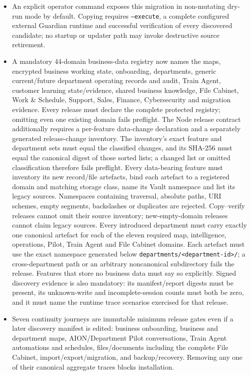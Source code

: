 \documentclass[11pt]{article}
\newcommand{\code}[1]{\texttt{#1}}
\begin{document}
\begin{itemize}
  \item An explicit operator command exposes this migration in non-mutating dry-run mode by default. Copying requires \code{--execute}, a complete configured external Guardian runtime and successful verification of every discovered candidate; no startup or updater path may invoke destructive source retirement.
  \item A mandatory 44-domain business-data registry now names the maps, encrypted business working state, onboarding, departments, generic current/future department operating records and audit, Train Agent, customer learning state/evidence, shared business knowledge, File Cabinet, Work \& Schedule, Support, Sales, Finance, Cybersecurity and migration evidence. Every release must declare the complete protected registry; omitting even one existing domain fails preflight. The Node release contract additionally requires a per-feature data-change declaration and a separately generated release-change inventory. The inventory's exact feature and department sets must equal the classified changes, and its SHA-256 must equal the canonical digest of those sorted lists; a changed list or omitted classification therefore fails preflight. Every data-bearing feature must inventory its new record/file artefacts, bind each artefact to a registered domain and matching storage class, name its Vault namespace and list its legacy sources. Namespaces containing traversal, absolute paths, URI schemes, empty segments, backslashes or duplicates are rejected. Copy--verify releases cannot omit their source inventory; new-empty-domain releases cannot claim legacy sources. Every introduced department must carry exactly one canonical artefact for each of the eleven required map, intelligence, operations, Pilot, Train Agent and File Cabinet domains. Each artefact must use the exact namespace generated below \code{departments/<department-id>/}; a cross-department path or an arbitrary noncanonical subdirectory fails the release. Features that store no business data must say so explicitly. Signed discovery evidence is also mandatory: its manifest/report digests must be present, its unknown-write and incomplete-session counts must both be zero, and it must name the runtime trace scenarios exercised for that release.
  \item Seven continuity journeys are immutable minimum release gates even if a later discovery manifest is edited: business onboarding, business and department maps, AION/Department Pilot conversations, Train Agent automations and schedules, files/documents including the complete File Cabinet, import/export/migration, and backup/recovery. Removing any one of their canonical aggregate traces blocks installation.

\end{itemize}
\end{document}
